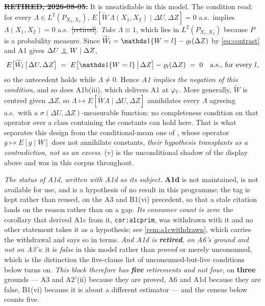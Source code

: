 \begin{assumption}\label{ass:instrcomp}
\textbf{\sout{RETIRED, 2026-08-05.}} It is unsatisfiable in this model. The condition read:
for every $\Lambda\in L^{2}(P_{X_1,X_2})$,
$E[\widetilde W\,\Lambda(X_1,X_2)\mid\Delta U,\Delta Z]=0$ a.s.\ implies
$\Lambda(X_1,X_2)=0$ a.s.\ \sout{[retired]}. \emph{Take $\Lambda\equiv1$}, which lies in
$L^{2}(P_{X_1,X_2})$ because $P$ is a probability measure. Since
$\widetilde W_l=\un\{W=l\}-\varrho_l(\Delta Z)$ by \eqref{eq:contrast} and A1 gives
$\Delta U\upmodels W\mid\Delta Z$,
\[
E\big[\widetilde W_l\,\big|\,\Delta U,\Delta Z\big]\;=\;E\big[\un\{W=l\}\,\big|\,\Delta Z\big]-\varrho_l(\Delta Z)\;=\;0
\quad\text{a.s., for every }l ,
\]
so the antecedent holds while $\Lambda\ne0$. Hence \emph{A1 implies the negation of this condition},
and so does A1b(iii), which delivers A1 at $\varphi_{\dagger}$. More generally, $\widetilde W$ is centred
given $\Delta Z$, so $\Lambda\mapsto E[\widetilde W\Lambda\mid\Delta U,\Delta Z]$ annihilates every
$\Lambda$ agreeing a.s.\ with a $\sigma(\Delta U,\Delta Z)$-measurable function: no completeness
condition on that operator over a class containing the constants can hold here. That is what separates
this design from the conditional-mean one of \citet{feve2014}, whose operator $g\mapsto E[g\mid W]$ does
not annihilate constants, \emph{their hypothesis transplants as a contradiction, not as an excess}.
\textup{(v)} is the unconditional shadow of the display above and was in this
corpus throughout.

\emph{The status of A1d, written with A1d as its subject.} \textbf{A1d} is not maintained, is not
available for use, and is a hypothesis of no result in this programme; the tag is kept rather than
reused, on the A3 and B1(vi) precedent, so that a stale citation lands on the reason rather than on a
gap. \emph{Its consumer count is zero}: the corollary that derived A1c from it, \texttt{cor:a1cprim},
was withdrawn with it and no other statement takes it as a hypothesis; see \cref{rem:a1cwithdrawn}, which
carries the withdrawal and says so in terms. \emph{And A1d is \textbf{retired}, on A6's ground and not on
A3's}: it is \emph{false} in this model rather than \emph{proved} or merely unconsumed, which is the
distinction the five-clause list of unconsumed-but-live conditions below turns on. \emph{This
block therefore has \textbf{five} retirements and not four}, on \textbf{three} grounds --- A3 and
A$2'$(ii) because they are proved, A6 and A1d because they are false, B1(vi) because it is about a
different estimator --- and the census below counts five.
\end{assumption}

